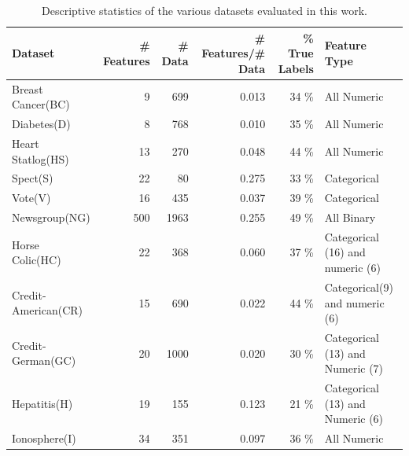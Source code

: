 \begin{table}[tbp!]
\centering
{\small 
\begin{tabular}{|l|r|r|r|r|l|} \hline
Dataset & \# Features & \# Data & \# Features/\# Data & \% True Labels & Feature Type\\ \hline \hline 
Breast Cancer(BC)	& 9	& 699	& 0.013	& 34 \%	& All Numeric\\ \hline
Diabetes(D)        & 8	& 768	& 0.010	& 35 \%	& All Numeric\\ \hline
Heart Statlog(HS)	& 13	& 270	& 0.048	& 44 \%	& All Numeric\\ \hline
Spect(S)	        & 22	& 80	& 0.275 & 33 \%	& Categorical\\ \hline
Vote(V)	        & 16	& 435	& 0.037	& 39 \%	& Categorical\\ \hline
Newsgroup(NG)	& 500	& 1963	& 0.255	& 49 \%	& All Binary\\ \hline
Horse Colic(HC)	& 22	& 368	& 0.060	& 37 \%	& Categorical (16) and numeric (6)\\ \hline
Credit-American(CR)	& 15	& 690	& 0.022	& 44 \%	& Categorical(9) and numeric (6)\\ \hline
Credit-German(GC)	& 20	& 1000	& 0.020 & 30 \%	& Categorical (13) and Numeric (7)\\ \hline
Hepatitis(H)	& 19	& 155	& 0.123	& 21 \%	& Categorical (13) and Numeric (6)\\ \hline
Ionosphere(I)	& 34	& 351	& 0.097	& 36 \%	& All Numeric\\ \hline
\end{tabular}}
\vspace{-1mm}
\caption{\footnotesize Descriptive statistics of the various datasets evaluated in this work.}
\label{table:stats}
\vspace{-4mm}
\end{table}

